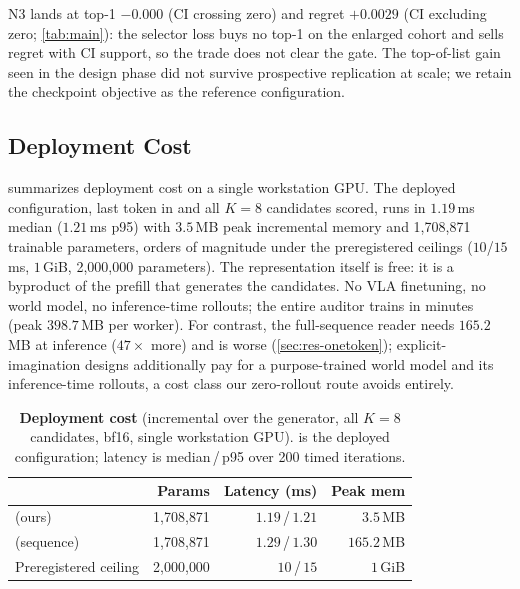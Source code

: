 N3 lands at top-1 $-0.000$ (CI crossing zero) and regret $+0.0029$ (CI excluding zero; \cref{tab:main}): the selector loss buys no top-1 on the enlarged cohort and sells regret with CI support, so the trade does not clear the gate.
The top-of-list gain seen in the design phase did not survive prospective replication at scale; we retain the checkpoint objective as the reference configuration.

\subsection{Deployment Cost}
\label{sec:res-eff}

 summarizes deployment cost on a single workstation GPU.
The deployed configuration, last token in and all $K{=}8$ candidates scored, runs in $1.19$\,ms median ($1.21$\,ms p95) with $3.5$\,MB peak incremental memory and 1{,}708{,}871 trainable parameters, orders of magnitude under the preregistered ceilings ($10$/$15$\,ms, $1$\,GiB, 2{,}000{,}000 parameters).
The representation itself is free: it is a byproduct of the prefill that generates the candidates.
No VLA finetuning, no world model, no inference-time rollouts; the entire auditor trains in minutes (peak $398.7$\,MB per worker).
For contrast, the full-sequence reader needs $165.2$\,MB at inference ($47\times$ more) and is worse (\cref{sec:res-onetoken}); explicit-imagination designs additionally pay for a purpose-trained world model and its inference-time rollouts, a cost class our zero-rollout route avoids entirely.

\begin{table}[t]
  \centering
  \small
  \setlength{\tabcolsep}{4pt}
  \begin{tabular}{@{}lrrr@{}}
    \toprule
    & Params & Latency (ms) & Peak mem \\
    \midrule
    \Ltok{} (ours) & 1{,}708{,}871 & $1.19$\,/\,$1.21$ & $3.5$\,MB \\
    \Lfull{} (sequence) & 1{,}708{,}871 & $1.29$\,/\,$1.30$ & $165.2$\,MB \\
    \midrule
    Preregistered ceiling & 2{,}000{,}000 & $10$\,/\,$15$ & $1$\,GiB \\
    \bottomrule
  \end{tabular}
  \caption{\textbf{Deployment cost} (incremental over the generator, all $K{=}8$ candidates, bf16, single workstation GPU). \Ltok{} is the deployed configuration; latency is median\,/\,p95 over 200 timed iterations.}
  \label{tab:eff}
\end{table}
